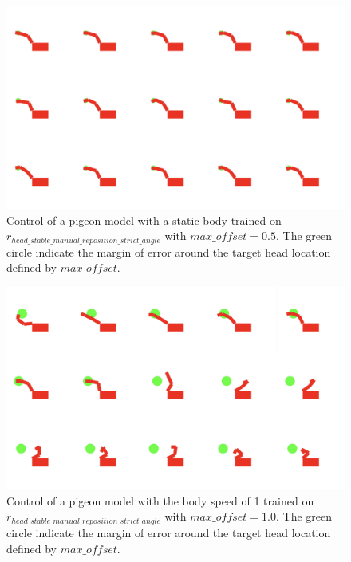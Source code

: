   \begin{figure}[H]
      \centering
      \includegraphics[width=1\textwidth]{figures/frames/frames_001.png}
      \caption{Control of a pigeon model with a static body trained on $r_{head\_stable\_manual\_reposition\_strict\_angle}$ with $max\_offset = 0.5$. The green circle indicate the margin of error around the target head location defined by $max\_offset$.}
      \label{fig:manual_trajectory_body_speed_0}
  \end{figure}

  \begin{figure}[H]
      \centering
      \includegraphics[width=1\textwidth]{figures/frames/frames_002.png}
      \caption{Control of a pigeon model with the body speed of 1 trained on $r_{head\_stable\_manual\_reposition\_strict\_angle}$ with $max\_offset = 1.0$. The green circle indicate the margin of error around the target head location defined by $max\_offset$.}
      \label{fig:manual_trajectory_strict_body_speed_1}
  \end{figure}

